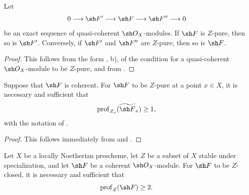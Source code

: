 \begin{corollary}[5.10.3]
\label{IV.5.10.3}
Let
\[
  0\longrightarrow\sh F'\longrightarrow\sh F
   \longrightarrow\sh F''\longrightarrow0
\]
be an exact sequence of quasi-coherent $\sh O_X$-modules.  If
$\sh F$ is $Z$-pure, then so is $\sh F'$.  Conversely, if $\sh F'$
and $\sh F''$ are $Z$-pure, then so is $\sh F$.
\end{corollary}


\begin{proof}
This follows from the form , {\rm b)}, of the
condition for a quasi-coherent $\sh O_X$-module to be $Z$-pure,
and from .
\end{proof}

\begin{corollary}[5.10.4]
\label{IV.5.10.4}
Suppose that $\sh F$ is coherent.  For $\sh F$ to be $Z$-pure at
a point $x\in X$, it is necessary and sufficient that
\[
  \operatorname{prof}_{Z_x}(\widetilde{\sh F}_x)\geq1,
\]
with the notation of .
\end{corollary}

\begin{proof}
This follows immediately from  and
.
\end{proof}

\begin{theorem}[5.10.5]
\label{IV.5.10.5}
Let $X$ be a locally Noetherian prescheme, let $Z$ be a subset of
$X$ stable under specialization, and let $\sh F$ be a coherent
$\sh O_X$-module.  For $\sh F$ to be $Z$-closed, it is necessary
and sufficient that
\[
  \operatorname{prof}_Z(\sh F)\geq2.
\]
\end{theorem}

